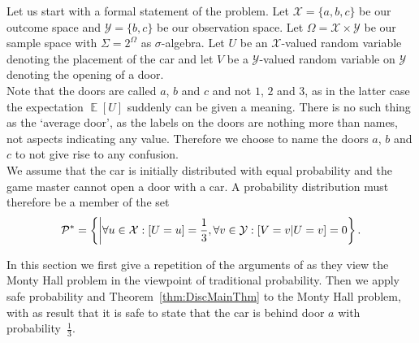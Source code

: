 \documentclass[a4paper]{report}
\theoremstyle{plain}
\theoremstyle{definition}
\theoremstyle{remark}
\numberwithin{equation}{chapter}
\let\P\relax
\DeclareMathOperator{\P}{\mathbb{P}}
\DeclareMathOperator{\E}{\mathbb{E}}
\DeclareMathOperator{\1}{\mathbbm{1}}
\newcommand{\X}{\mathcal{X}}
\newcommand{\Y}{\mathcal{Y}}
\newcommand{\Pmod}{\mathcal{P}^*}
\begin{document}
Let us start with a formal statement of the problem. Let $\X=\{a,b,c\}$ be our outcome space and $\Y=\{b,c\}$ be our observation space. Let $\Omega=\X\times\Y$ be our sample space with $\Sigma=2^\Omega$ as $\sigma$-algebra. Let $U$ be an $\X$-valued random variable denoting the placement of the car and let $V$ be a $\Y$-valued random variable on $\Y$ denoting the opening of a door.\\
Note that the doors are called $a$, $b$ and $c$ and not $1$, $2$ and $3$, as in the latter case the expectation $\E[U]$ suddenly can be given a meaning. There is no such thing as the `average door', as the labels on the doors are nothing more than names, not aspects indicating any value. Therefore we choose to name the doors $a$, $b$ and $c$ to not give rise to any confusion.\\
We assume that the car is initially distributed with equal probability and the game master cannot open a door with a car. A probability distribution must therefore be a member of the set
\begin{equation}
\Pmod=\left\{\P\middle|\forall u\in\X:\P[U=u]=\frac{1}{3},\forall v\in\Y:\P[V=v|U=v]=0\right\}.
\end{equation}

In this section we first give a repetition of the arguments of \cite{Grunwald13} as they view the Monty Hall problem in the viewpoint of traditional probability. Then we apply safe probability and Theorem~\ref{thm:DiscMainThm} to the Monty Hall problem, with as result that it is safe to state that the car is behind door $a$ with probability~$\frac{1}{3}$.
\end{document}
